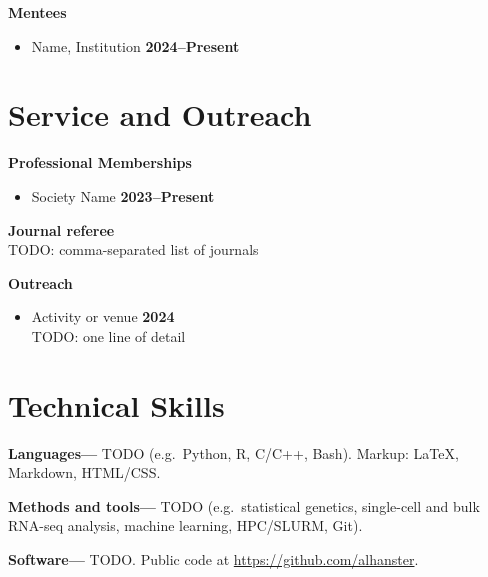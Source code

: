 \begin{resume}
{\bf Mentees}
\begin{itemize}
\item[ ] Name, Institution \hfill {\bf 2024--Present}
\end{itemize}

\section{Service and Outreach}
{\bf Professional Memberships}
\vspace*{.05in}
\begin{itemize}
\item[ ] Society Name \hfill {\bf 2023--Present}
\end{itemize}

{\bf Journal referee}
\vspace*{.05in}\\
\hspace*{1em}
TODO: comma-separated list of journals

{\bf Outreach}
\vspace*{.05in}
\begin{itemize}
\item[ ] Activity or venue \hfill {\bf 2024} \\
  \hspace*{1em} TODO: one line of detail
\end{itemize}

\section{Technical Skills}
{\bf Languages---}%
TODO (e.g.\ Python, R, C/C++, Bash).
Markup: \LaTeX, Markdown, HTML/CSS.

{\bf Methods and tools---}%
TODO (e.g.\ statistical genetics, single-cell and bulk RNA-seq analysis,
machine learning, HPC/SLURM, Git).

{\bf Software---}%
TODO. Public code at \url{https://github.com/alhanster}.

\newpage{}


\end{resume}
